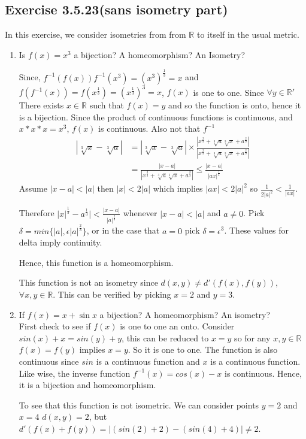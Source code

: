 \documentclass{tufte-book}
\theoremstyle{mytheoremstyle}
\theoremstyle{mylemstyle}
\theoremstyle{mydefstyle}
\begin{document}
\subsection{Exercise 3.5.23(sans isometry part)}
In  this exercise, we consider isometries from from $\mathbb{R}$ to itself in the usual metric.
\begin{enumerate}
\item Is $f(x) = x^3$ a bijection? A homeomorphism? An Isometry?

Since, $f^{-1}(f(x)) f^{-1}(x^3) = (x^3)^\frac{1}{3} = x$ and $f(f^{-1}(x))  = f(x^\frac{1}{3}) =(x^\frac{1}{3})^3 = x$, $f(x)$ is one to one.  Since $\forall y \in \mathbb{R}'$ There exists $x \in \mathbb{R}$ such that $f(x) = y$ and  so the function is onto, hence it is a bijection.   Since the product of continuous functions is continuous, and $x * x* x= x^3$, $f(x)$ is continuous.  Also not that $f^{-1}$
\begin{align*}
|\sqrt[3]{x}-\sqrt[3]{a}| &= |\sqrt[3]{x}-\sqrt[3]{a}| \times \frac {| x^{\frac 2 3} + \sqrt[3]{a}\sqrt[3]{x} + a^{\frac 2 3} |}{|x^{\frac 2 3} + \sqrt[3]{a}\sqrt[3]{x} + a^{\frac 2 3} |}\\
&= \frac {|x - a|}{|x^{\frac 2 3} + \sqrt[3]{a}\sqrt[3]{x} + a^{\frac 2 3} |} \le \frac {| x - a |}{| {ax} |^{\frac 1 3}}
\end{align*}
Assume $|x-a| < |a|$ then $|x| < 2|a|$ which implies $|ax| < 2|a|^2$ so  $\frac {1}{2|a|^2} < \frac {1} {|ax|}$.

Therefore $|x|^{\frac{1}{3}} - a^{\frac{1}{3}}| < \frac{|x-a|}{|{a}|^{\frac{2}{3}}}$ whenever $|x - a| < |a|$ and $a \neq 0$.  Pick $\delta = min\{|a|, \epsilon|a|^\frac{2}{3}\}$, or in the case that $a = 0$ pick $\delta = \epsilon^3$.  These values for delta imply continuity.

Hence, this function is a homeomorphism. 

This function is not an isometry since $d(x,y) \neq d'(f(x), f(y))$, $\forall x,y \in \mathbb{R}$.  This can be verified by picking $x = 2$ and $y=3$.

\item If $f(x) = x + \sin x$ a bijection? A homeomorphism? An isometry?\\
First check to see if $f(x)$ is one to one an onto.  Consider $sin(x) + x = sin(y) + y$, this can be reduced to $x=y$ so for any $x,y \in \mathbb{R}$ $f(x) = f(y)$ implies $x = y$. So it is one to one.  The function is also continuous since $sin$ is a continuous function and $x$ is a continuous function.  Like wise, the inverse function $f^{-1}(x) = cos(x) - x$ is continuous.  Hence, it is a bijection and homeomorphism.

To see that this function is not isometric.  We can consider points $y=2$ and $x= 4$ $d(x,y) = 2$, but $d'(f(x) + f(y)) = |(sin(2) + 2) - (sin(4) + 4)| \neq 2$.

\end{enumerate}
\end{document}

